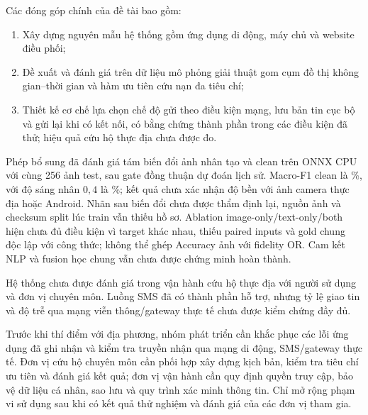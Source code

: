 Các đóng góp chính của đề tài bao gồm:
\begin{enumerate}
\item Xây dựng nguyên mẫu hệ thống gồm ứng dụng di động, máy chủ và website điều phối;
\item Đề xuất và đánh giá trên dữ liệu mô phỏng giải thuật gom cụm đồ thị không gian--thời gian và hàm ưu tiên cứu nạn đa tiêu chí;
\item Thiết kế cơ chế lựa chọn chế độ gửi theo điều kiện mạng, lưu bản tin cục bộ và gửi lại khi có kết nối, có bằng chứng thành phần trong các điều kiện đã thử; hiệu quả cứu hộ thực địa chưa được đo.
\end{enumerate}

Phép bổ sung đã đánh giá tám biến đổi ảnh nhân tạo và clean trên ONNX CPU với cùng 256 ảnh test, sau gate đồng thuận dự đoán lịch sử. Macro-F1 clean là \QualityCleanMacroFOne\%, với độ sáng nhân $0{,}4$ là \QualityDarkMacroFOne\%; kết quả chưa xác nhận độ bền với ảnh camera thực địa hoặc Android. Nhãn sau biến đổi chưa được thẩm định lại, nguồn ảnh và checksum split lúc train vẫn thiếu hồ sơ. Ablation image-only/text-only/both hiện chưa đủ điều kiện vì target khác nhau, thiếu paired inputs và gold chung độc lập với công thức; không thể ghép Accuracy ảnh với fidelity OR. Cam kết NLP và fusion học chung vẫn chưa được chứng minh hoàn thành.

Hệ thống chưa được đánh giá trong vận hành cứu hộ thực địa với người sử dụng và đơn vị chuyên môn. Luồng SMS đã có thành phần hỗ trợ, nhưng tỷ lệ giao tin và độ trễ qua mạng viễn thông/gateway thực tế chưa được kiểm chứng đầy đủ.

Trước khi thí điểm với địa phương, nhóm phát triển cần khắc phục các lỗi ứng dụng đã ghi nhận và kiểm tra truyền nhận qua mạng di động, SMS/gateway thực tế. Đơn vị cứu hộ chuyên môn cần phối hợp xây dựng kịch bản, kiểm tra tiêu chí ưu tiên và đánh giá kết quả; đơn vị vận hành cần quy định quyền truy cập, bảo vệ dữ liệu cá nhân, sao lưu và quy trình xác minh thông tin. Chỉ mở rộng phạm vi sử dụng sau khi có kết quả thử nghiệm và đánh giá của các đơn vị tham gia.

